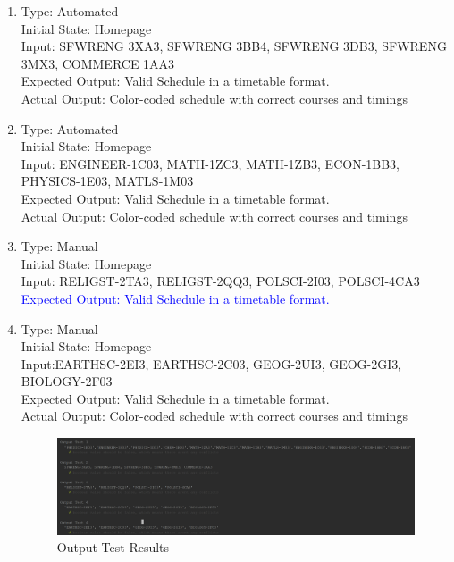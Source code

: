 \documentclass[11pt, oneside]{article}
\begin{document}
\begin{enumerate}
\item Type: Automated \\
Initial State: Homepage \\
Input: SFWRENG 3XA3, SFWRENG 3BB4, SFWRENG 3DB3, SFWRENG 3MX3, COMMERCE 1AA3 \\
Expected Output: Valid Schedule in a timetable format. \\
Actual Output: Color-coded schedule with correct courses and timings \\

\item Type: Automated \\
Initial State: Homepage \\
Input:  ENGINEER-1C03, MATH-1ZC3, MATH-1ZB3,  ECON-1BB3, PHYSICS-1E03, MATLS-1M03 \\
Expected Output: Valid Schedule in a timetable format. \\
Actual Output: Color-coded schedule with correct courses and timings \\

\item Type: Manual \\
Initial State: Homepage \\
Input: RELIGST-2TA3, RELIGST-2QQ3, POLSCI-2I03, POLSCI-4CA3\\
\textcolor{blue}{Expected Output: Valid Schedule in a timetable format.} \\

\item Type: Manual \\
Initial State: Homepage \\
Input:EARTHSC-2EI3, EARTHSC-2C03, GEOG-2UI3, GEOG-2GI3, BIOLOGY-2F03\\
Expected Output: Valid Schedule in a timetable format. \\
Actual Output: Color-coded schedule with correct courses and timings \\

\begin{figure}[h]
    \centering
    \includegraphics[width=170mm]{OResults.PNG}
    \caption{Output Test Results}
    \label{fig:my_label}
\end{figure} 
\end{enumerate}
\end{document}
